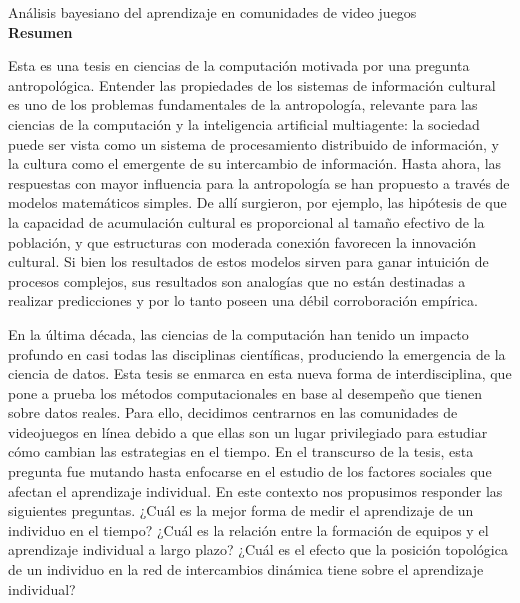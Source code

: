 \documentclass[a4paper,11pt]{book}
\theoremstyle{definition}
\newcommand{\TITULO}[0]{Análisis bayesiano del aprendizaje en comunidades de video juegos}
\begin{document}
\thispagestyle{empty}
\phantom{Pagina en blanco}
\newpage


\phantom{.}

\vspace{6cm}

\hfill  {}

\newpage

\phantom{Pagina en blanco}

\newpage

\begin{center}
\Large \TITULO \normalsize \\[0.5cm]

\textbf{Resumen}
\end{center}

\small

Esta es una tesis en ciencias de la computación motivada por una pregunta antropológica.
Entender las propiedades de los sistemas de información cultural es uno de los problemas fundamentales de la antropología, relevante para las ciencias de la computación y la inteligencia artificial multiagente: la sociedad puede ser vista como un sistema de procesamiento distribuido de información, y la cultura como el emergente de su intercambio de información.
Hasta ahora, las respuestas con mayor influencia para la antropología se han propuesto a través de modelos matemáticos simples.
De allí surgieron, por ejemplo, las hipótesis de que la capacidad de acumulación cultural es proporcional al tamaño efectivo de la población, y que estructuras con moderada conexión favorecen la innovación cultural.
Si bien los resultados de estos modelos sirven para ganar intuición de procesos complejos, sus resultados son analogías que no están destinadas a realizar predicciones y por lo tanto poseen una débil corroboración empírica.


En la última década, las ciencias de la computación han tenido un impacto profundo en casi todas las disciplinas científicas, produciendo la emergencia de la ciencia de datos.
Esta tesis se enmarca en esta nueva forma de interdisciplina, que pone a prueba los métodos computacionales en base al desempeño que tienen sobre datos reales.
Para ello, decidimos centrarnos en las comunidades de videojuegos en línea debido a que ellas son un lugar privilegiado para estudiar cómo cambian las estrategias en el tiempo.
En el transcurso de la tesis, esta pregunta fue mutando hasta enfocarse en el estudio de los factores sociales que afectan el aprendizaje individual.
En este contexto nos propusimos responder las siguientes preguntas.
¿Cuál es la mejor forma de medir el aprendizaje de un individuo en el tiempo?
¿Cuál es la relación entre la formación de equipos y el aprendizaje individual a largo plazo?
¿Cuál es el efecto que la posición topológica de un individuo en la red de intercambios dinámica tiene sobre el aprendizaje individual?
\end{document}

